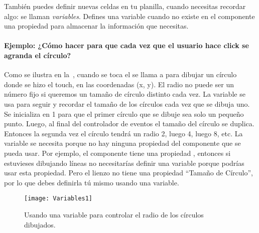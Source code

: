 {{También puedes definir nuevas celdas en tu planilla, cuando necesitas
recordar algo: se llaman \emph{variables}. Defines una variable cuando
no existe en el componente una propiedad para almacenar la información
que necesitas.

\paragraph{Ejemplo: ¿Cómo hacer para que cada vez que el usuario hace click se agranda el círculo?}

Como se ilustra en la~, cuando se toca el
 se llama a  para
dibujar un círculo donde se hizo el touch, en las coordenadas (x,
y). El radio  no puede ser un número fijo si queremos un
tamaño de círculo distinto cada vez. La variable
 se usa para seguir y recordar el tamaño de
los círculos cada vez que se dibuja uno. Se inicializa
 en 1 para que el primer círculo que se dibuje
sea solo un pequeño punto. Luego, al final del controlador de eventos
 el tamaño del círculo se duplica. Entonces la
segunda vez el círculo tendrá un radio 2, luego 4, luego 8, etc. La
variable  se necesita porque no hay ninguna
propiedad del componente que se pueda usar. Por ejemplo, el componente
 tiene una propiedad ,
entonces si estuvieses dibujando líneas no necesitarías definir una
variable porque podrías usar esta propiedad. Pero el lienzo no tiene
una propiedad ``Tamaño de Círculo'', por lo que debes definirla tú
mismo usando una variable.

\begin{figure}[H]
\centering
\texttt{[image: Variables1]}
\caption{Usando una variable para controlar el radio de los círculos dibujados.}
\label{fig:Variables1}
\end{figure}


}}
